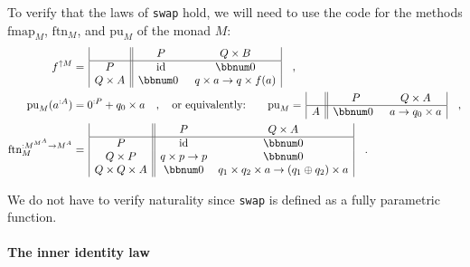To verify that the laws of \lstinline!swap! hold, we will need to
use the code for the methods $\text{fmap}_{M}$, $\text{ftn}_{M}$,
and $\text{pu}_{M}$ of the monad $M$:
\begin{align*}
f^{\uparrow M} & =\,\begin{array}{|c||cc|}
 & P & Q\times B\\
\hline P & \text{id} & \bbnum 0\\
Q\times A & \bbnum 0\enskip & q\times a\rightarrow q\times f(a)
\end{array}\quad,\\
\text{pu}_{M}(a^{:A}) & =0^{:P}+q_{0}\times a\quad,\quad\text{or equivalently:}\quad\quad\text{pu}_{M}=\,\begin{array}{|c||cc|}
 & P & Q\times A\\
\hline A & \bbnum 0\enskip & a\rightarrow q_{0}\times a
\end{array}\quad,\\
\text{ftn}_{M}^{:M^{M^{A}}\rightarrow M^{A}} & =\,\begin{array}{|c||cc|}
 & P & Q\times A\\
\hline P & \text{id} & \bbnum 0\\
Q\times P & q\times p\rightarrow p & \bbnum 0\\
Q\times Q\times A & \bbnum 0 & q_{1}\times q_{2}\times a\rightarrow\left(q_{1}\oplus q_{2}\right)\times a
\end{array}\quad.
\end{align*}

We do not have to verify naturality since \lstinline!swap! is defined
as a fully parametric function.

\paragraph{The inner identity law}


